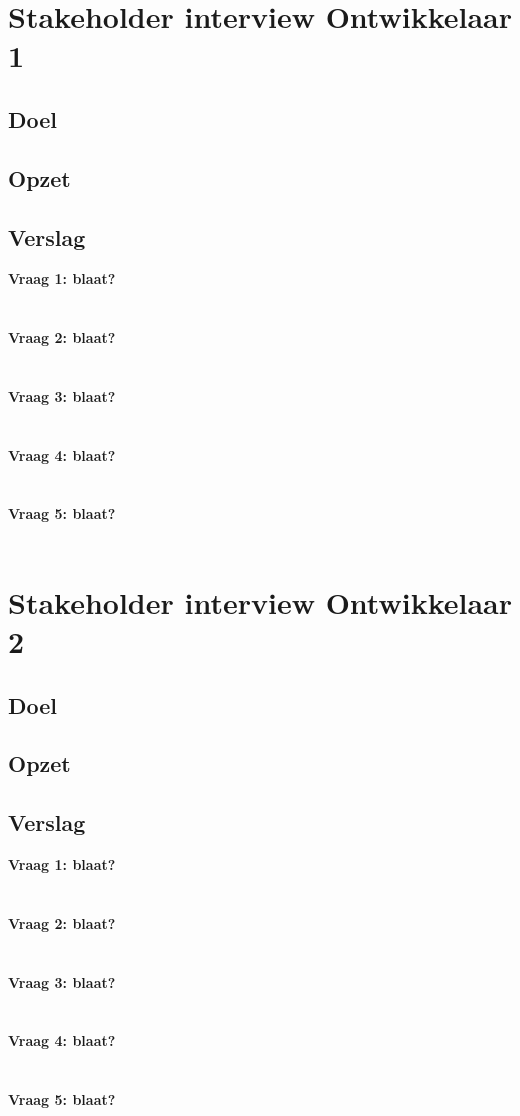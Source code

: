 \section{Stakeholder interview Ontwikkelaar 1}
\subsection{Doel}
\subsection{Opzet}
\subsection{Verslag}
\textbf{Vraag 1: blaat?}\\
\lipsum[01]\\
\\
\textbf{Vraag 2: blaat?}\\
\lipsum[02]\\
\\
\textbf{Vraag 3: blaat?}\\
\lipsum[03]\\
\\
\textbf{Vraag 4: blaat?}\\
\lipsum[04]\\
\\
\textbf{Vraag 5: blaat?}\\
\lipsum[05]\\


\section{Stakeholder interview Ontwikkelaar 2}
\subsection{Doel}
\subsection{Opzet}
\subsection{Verslag}
\textbf{Vraag 1: blaat?}\\
\lipsum[01]\\
\\
\textbf{Vraag 2: blaat?}\\
\lipsum[02]\\
\\
\textbf{Vraag 3: blaat?}\\
\lipsum[03]\\
\\
\textbf{Vraag 4: blaat?}\\
\lipsum[04]\\
\\
\textbf{Vraag 5: blaat?}\\
\lipsum[05]\\




